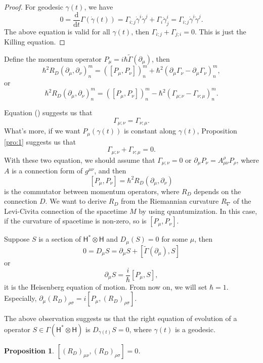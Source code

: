 \documentclass[12pt]{article}
\theoremstyle{definition}
\theoremstyle{plain}
\newtheorem{pro}[para]{Proposition}
\begin{document}
\begin{proof}
For geodesic $\gamma(t)$, we have
\[
	0=\frac{\mathrm d}{\mathrm dt}\Gamma(\dot\gamma(t))=\Gamma_{i;j}\dot\gamma^i\dot\gamma^j+\Gamma_{i}\ddot\gamma_{j}^i=\Gamma_{i;j}\dot\gamma^i\dot\gamma^j.
\]
The above equation is valid for all $\gamma(t)$, then $\Gamma_{i;j}+\Gamma_{j;i}=0$. This is just the Killing equation.
\end{proof}

Define the momentum operator $P_\mu=i\hbar \widetilde{\Gamma}(\partial_\mu)$, then
\[
	\hbar^2 R_D(\partial_\mu,\partial_\nu)^m_n=([P_\mu,P_\nu])^m_n+\hbar^2(\partial_\mu\Gamma_\nu - \partial_\mu\Gamma_\nu)^m_n,
\]
or
\begin{equation}
	\hbar^2 R_D(\partial_\mu,\partial_\nu)^m_n=([P_\mu,P_\nu])^m_n-\hbar^2(\Gamma_{\mu;\nu} - \Gamma_{\nu;\mu})^m_n.
\end{equation}

Equation (\theequation) suggests us that
\[
	\Gamma_{\mu;\nu}=\Gamma_{\nu;\mu}.
\]
What's more, if we want $P_\mu(\gamma(t))$ is constant along $\gamma(t)$, Proposition \ref{pro:1} suggests us that
\[
	\Gamma_{\mu;\nu}+\Gamma_{\nu;\mu}=0.
\]
With these two equation, we should assume that $\Gamma_{\mu;\nu}=0$ or $\partial_\mu P_\nu=A_{\mu\nu}^\rho P_\rho$, where $A$ is a connection form of $g^{\mu\nu}$, and then
\[
	[P_\mu,P_\nu]=\hbar^2 R_D(\partial_\mu,\partial_\nu)
\]
is the commutator between momentum operators, where $R_D$ depends on the connection $D$. We want to derive $R_D$ from the Riemannian curvature $R_\nabla$ of the Levi-Civita connection of the spacetime $M$ by using quantumization. In this case, if the curvature of spacetime is non-zero, so is $[P_\mu,P_\nu]$.

Suppose $S$ is a section of $\mathsf{H}^*\otimes \mathsf{H}$ and $D_\mu(S)=0$ for some $\mu$, then
\[
	0=D_\mu S= \partial_\mu S+[\widetilde{\Gamma}(\partial_\mu),S]
\]
or
\[
	\partial_\mu S=\frac{i}{\hbar}[P_\mu,S],
\]
it is the Heisenberg equation of motion. From now on, we will set $\hbar=1$. Especially, $\partial_\mu (R_D)_{\rho\sigma}=i[P_\mu,(R_D)_{\rho\sigma}]$.

The above observation suggests us that the right equation of evolution of a operator $S\in \Gamma (\mathsf{H}^*\otimes \mathsf{H})$ is $D_{\dot\gamma(t)}S=0$, where $\gamma(t)$ is a geodesic.

\begin{pro}
		$[(R_D)_{\mu\nu},(R_D)_{\rho\sigma}]=0$.
\end{pro}
\end{document}
